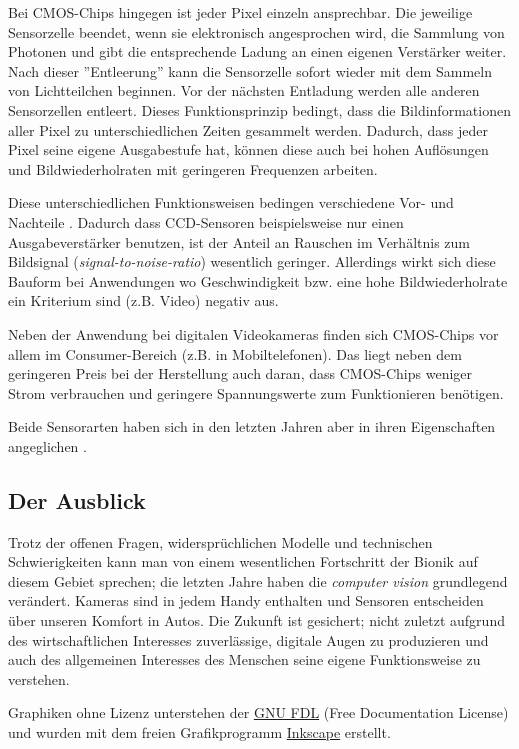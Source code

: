 \documentclass[12pt,a4paper]{article}
\newcommand{\fw}[1]{\textit{#1}}
\newcommand{\Se}[1]{S. #1}
\begin{document}
Bei CMOS-Chips \cite[\Se{2}]{photo} hingegen ist jeder Pixel einzeln
ansprechbar. Die jeweilige Sensorzelle beendet, wenn sie elektronisch
angesprochen wird, die Sammlung von Photonen und gibt die entsprechende
Ladung an einen eigenen Verstärker weiter. Nach dieser ''Entleerung'' kann
die Sensorzelle sofort wieder mit dem Sammeln von Lichtteilchen beginnen.
Vor der nächsten Entladung werden alle anderen Sensorzellen entleert.
Dieses Funktionsprinzip bedingt, dass die Bildinformationen aller Pixel zu
unterschiedlichen Zeiten gesammelt werden. Dadurch, dass jeder Pixel seine
eigene Ausgabestufe hat, können diese auch bei hohen Auflösungen und
Bildwiederholraten mit geringeren Frequenzen arbeiten.

Diese unterschiedlichen Funktionsweisen bedingen verschiedene Vor- und
Nachteile \cite{photo}. Dadurch dass CCD-Sensoren beispielsweise nur einen
Ausgabeverstärker benutzen, ist der Anteil an Rauschen im Verhältnis zum
Bildsignal (\fw{signal-to-noise-ratio}) wesentlich geringer. Allerdings wirkt
sich diese Bauform bei Anwendungen wo Geschwindigkeit bzw. eine hohe
Bildwiederholrate ein Kriterium sind (z.B. Video) negativ aus.

Neben der Anwendung bei digitalen Videokameras finden sich CMOS-Chips vor allem
im Consumer-Bereich (z.B. in Mobiltelefonen). Das liegt neben dem geringeren
Preis bei der Herstellung auch daran, dass CMOS-Chips weniger Strom verbrauchen
und geringere Spannungswerte zum Funktionieren benötigen.

Beide Sensorarten haben sich in den letzten Jahren aber in ihren Eigenschaften
angeglichen \cite[\Se{6}]{compis}.

\subsection{Der Ausblick}

Trotz der offenen Fragen, widersprüchlichen Modelle und technischen
Schwierigkeiten kann man von einem wesentlichen Fortschritt der Bionik auf
diesem Gebiet sprechen; die letzten Jahre haben die \fw{computer vision}
grundlegend verändert. Kameras sind in jedem Handy enthalten und Sensoren
entscheiden über unseren Komfort in Autos. Die Zukunft ist gesichert; nicht
zuletzt aufgrund des wirtschaftlichen Interesses zuverlässige, digitale Augen
zu produzieren und auch des allgemeinen Interesses des Menschen seine eigene
Funktionsweise zu verstehen.


\newpage

\listoffigures

Graphiken ohne Lizenz unterstehen der
\href{http://www.gnu.org/licenses/fdl.html}{GNU FDL} (Free Documentation
License) und wurden mit dem freien Grafikprogramm
\href{http://inkscape.org/}{Inkscape} erstellt.



\end{document}
